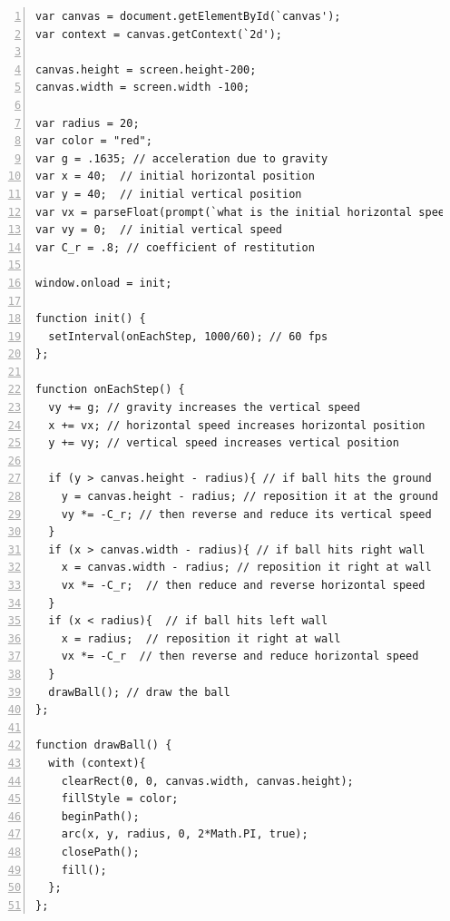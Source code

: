 \vspace{2mm}
\begin{lstlisting}[breaklines=true, frame=single, numbers=left, caption=A basic ball bouncing simulation, label=lst:ballbounce1]
var canvas = document.getElementById(`canvas');
var context = canvas.getContext(`2d'); 

canvas.height = screen.height-200;
canvas.width = screen.width -100;

var radius = 20;
var color = "red";
var g = .1635; // acceleration due to gravity
var x = 40;  // initial horizontal position
var y = 40;  // initial vertical position
var vx = parseFloat(prompt(`what is the initial horizontal speed of ball you would like?(recommended values of 1-20'));  // initial horizontal speed 
var vy = 0;  // initial vertical speed
var C_r = .8; // coefficient of restitution
 
window.onload = init; 
 
function init() {
  setInterval(onEachStep, 1000/60); // 60 fps
};
 
function onEachStep() {
  vy += g; // gravity increases the vertical speed
  x += vx; // horizontal speed increases horizontal position 
  y += vy; // vertical speed increases vertical position

  if (y > canvas.height - radius){ // if ball hits the ground
    y = canvas.height - radius; // reposition it at the ground
    vy *= -C_r; // then reverse and reduce its vertical speed
  }
  if (x > canvas.width - radius){ // if ball hits right wall
    x = canvas.width - radius; // reposition it right at wall 
    vx *= -C_r;  // then reduce and reverse horizontal speed
  }
  if (x < radius){  // if ball hits left wall
    x = radius;  // reposition it right at wall
    vx *= -C_r  // then reverse and reduce horizontal speed
  }
  drawBall(); // draw the ball
};
 
function drawBall() {
  with (context){
    clearRect(0, 0, canvas.width, canvas.height); 
    fillStyle = color;
    beginPath();
    arc(x, y, radius, 0, 2*Math.PI, true);
    closePath();
    fill();
  };
};

\end{lstlisting}

